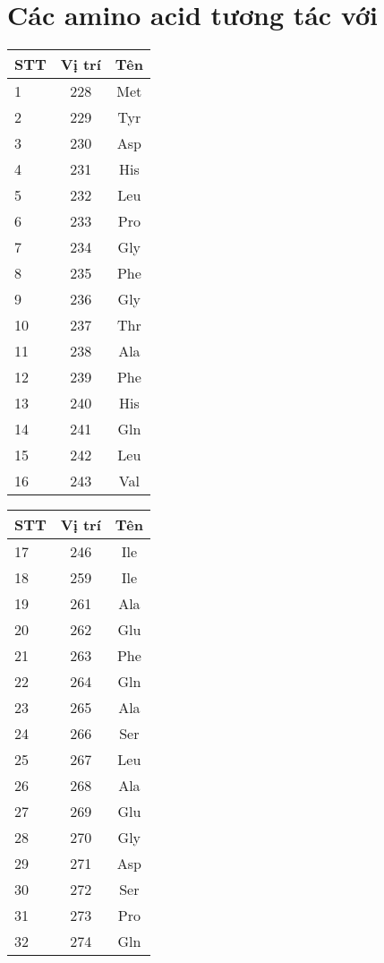 \chapter{Các amino acid tương tác với }
\label{81residues}
\begin{multicols}{3}
\begin{tabular}{l|c c}
\hline
STT & Vị trí & Tên \\
\hline
1 & 228& Met \\
2 & 229& Tyr \\
3 & 230& Asp \\
4 & 231& His \\
5 & 232& Leu \\
6 & 233& Pro \\
7 & 234& Gly \\
8 & 235& Phe \\
9 & 236& Gly \\
10 & 237& Thr \\
11 & 238& Ala \\
12 & 239& Phe \\
13 & 240& His \\
14 & 241& Gln \\
15 & 242& Leu \\
16 & 243& Val \\
\end{tabular}

\begin{tabular}{l|c c}
\hline
STT & Vị trí & Tên \\
\hline
17 & 246& Ile \\
18 & 259& Ile \\
19 & 261& Ala \\
20 & 262& Glu \\
21 & 263& Phe \\
22 & 264& Gln \\
23 & 265& Ala \\
24 & 266& Ser \\
25 & 267& Leu \\
26 & 268& Ala \\
27 & 269& Glu \\
28 & 270& Gly \\
29 & 271& Asp \\
30 & 272& Ser \\
31 & 273& Pro \\
32 & 274& Gln \\
\end{tabular}


\end{multicols}

